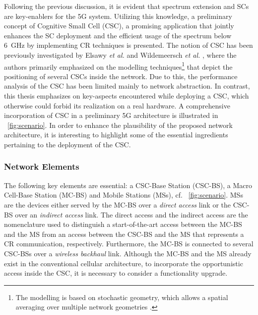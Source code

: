 Following the previous discussion, it is evident that spectrum extension and SCs are key-enablers for the 5G system.
Utilizing this knowledge, a preliminary concept of Cognitive Small Cell (CSC), a promising application that jointly enhances the SC deployment and the efficient usage of the spectrum below \SI{6}{GHz} by implementing CR techniques is presented. The notion of CSC has been previously investigated by Elsawy \textit{et al.} \cite{Elsawy13, Elsawy13_cmag} and Wildemeersch \textit{et al.} \cite{Wild13}, where the authors primarily emphasized on the modelling techniques\footnote{The modelling is based on stochastic geometry, which allows a spatial averaging over multiple network geometries \cite{Haenggi, Haenggi08now}.} that depict the positioning of several CSCs inside the network. Due to this, the performance analysis of the CSC has been limited mainly to network abstraction. In contrast, this thesis emphasizes on key-aspects encountered while deploying a CSC, which otherwise could forbid its realization on a real hardware. %
 A comprehensive incorporation of CSC in a preliminary 5G architecture is illustrated in \figurename~\ref{fig:scenario}. In order to enhance the plausibility of the proposed network architecture, it is interesting to highlight some of the essential ingredients pertaining to the deployment of the CSC.

\subsubsection*{Network Elements}
 The following key elements are essential: a CSC-Base Station (CSC-BS), a Macro Cell-Base Station (MC-BS) and Mobile Stations (MSs), cf. \figurename~\ref{fig:scenario}. MSs are the devices either served by the MC-BS over a \textit{direct access} link or the CSC-BS over an \textit{indirect access} link. The direct access and the indirect access are the nomenclature used to distinguish a start-of-the-art access between the MC-BS and the MS from an access between the CSC-BS and the MS that represents a CR communication, respectively. Furthermore, the MC-BS is connected to several CSC-BSs over a \textit{wireless backhaul} link. Although the MC-BS and the MS already exist in the conventional cellular architecture, to incorporate the opportunistic access inside the CSC, it is necessary to consider a functionality upgrade.

